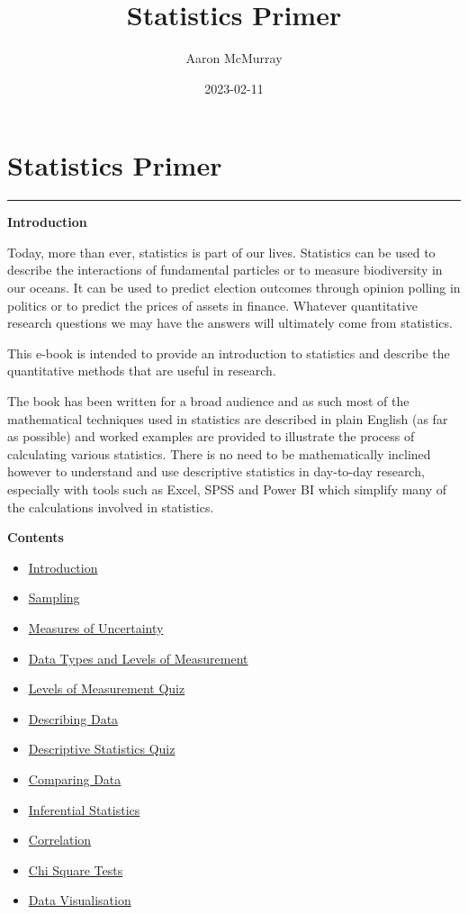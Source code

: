 \documentclass[
]{book}
\title{Statistics Primer}
\author{Aaron McMurray}
\date{2023-02-11}
\providecommand{\tightlist}{%
  \setlength{\itemsep}{0pt}\setlength{\parskip}{0pt}}
\begin{document}
\maketitle

{
\setcounter{tocdepth}{1}
\tableofcontents
}
\hypertarget{Statistics-Primer}{%
\chapter*{Statistics Primer}\label{Statistics-Primer}}

\begin{center}\rule{0.5\linewidth}{0.5pt}\end{center}

\textbf{Introduction}

Today, more than ever, statistics is part of our lives. Statistics can be used to describe the interactions of fundamental particles or to measure biodiversity in our oceans. It can be used to predict election outcomes through opinion polling in politics or to predict the prices of assets in finance. Whatever quantitative research questions we may have the answers will ultimately come from statistics.

This e-book is intended to provide an introduction to statistics and describe the quantitative methods that are useful in research.

The book has been written for a broad audience and as such most of the mathematical techniques used in statistics are described in plain English (as far as possible) and worked examples are provided to illustrate the process of calculating various statistics. There is no need to be mathematically inclined however to understand and use descriptive statistics in day-to-day research, especially with tools such as Excel, SPSS and Power BI which simplify many of the calculations involved in statistics.

\textbf{Contents}

\begin{itemize}
\tightlist
\item
  \protect\hyperlink{intro}{Introduction}
\item
  \protect\hyperlink{sampling}{Sampling}
\item
  \protect\hyperlink{error}{Measures of Uncertainty}
\item
  \protect\hyperlink{datatypes}{Data Types and Levels of Measurement}
\item
  \protect\hyperlink{quizone}{Levels of Measurement Quiz}
\item
  \protect\hyperlink{descdata}{Describing Data}
\item
  \protect\hyperlink{quiztwo}{Descriptive Statistics Quiz}
\item
  \protect\hyperlink{compdat}{Comparing Data}
\item
  \protect\hyperlink{infstat}{Inferential Statistics}
\item
  \protect\hyperlink{correlationchapter}{Correlation}
\item
  \protect\hyperlink{chisq}{Chi Square Tests}
\item
  \protect\hyperlink{datvis}{Data Visualisation}
\end{itemize}
\end{document}
